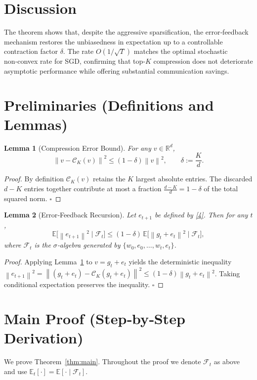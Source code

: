 \documentclass{article}
\newtheorem{lemma}{Lemma}
\newcommand{\E}{\mathbb{E}}
\newcommand{\R}{\mathbb{R}}
\newcommand{\norm}[1]{\left\lVert#1\right\rVert}
\newcommand{\topK}[1]{\mathcal{C}_K\!\left(#1\right)}
\begin{document}
\section*{Discussion}
The theorem shows that, despite the aggressive sparsification, the error‑feedback mechanism restores the unbiasedness in expectation up to a controllable contraction factor $\delta$. The rate $O(1/\sqrt{T})$ matches the optimal stochastic non‑convex rate for SGD, confirming that top‑$K$ compression does not deteriorate asymptotic performance while offering substantial communication savings.

\newpage
\section*{Preliminaries (Definitions and Lemmas)}
\begin{lemma}[Compression Error Bound]\label{lem:comp}
For any $v\in\R^d$,
\[
\norm{v-\topK{v}}^2\le(1-\delta)\norm{v}^2,\qquad \delta:=\frac{K}{d}.
\]
\end{lemma}
\begin{proof}
By definition $\topK{v}$ retains the $K$ largest absolute entries. The discarded $d-K$ entries together contribute at most a fraction $\frac{d-K}{d}=1-\delta$ of the total squared norm. \hfill $\square$
\end{proof}

\begin{lemma}[Error‑Feedback Recursion]\label{lem:error-bounded}
Let $e_{t+1}$ be defined by \eqref{4}. Then for any $t$,
\[
\E\!\big[\norm{e_{t+1}}^2\mid\mathcal{F}_t\big]
\le (1-\delta)\,\E\!\big[\norm{g_t+e_t}^2\mid\mathcal{F}_t\big],
\tag{6}
\]
where $\mathcal{F}_t$ is the $\sigma$‑algebra generated by $\{w_0,e_0,\dots,w_t,e_t\}$.
\end{lemma}
\begin{proof}
Applying Lemma~\ref{lem:comp} to $v=g_t+e_t$ yields the deterministic inequality
$\norm{e_{t+1}}^2=\norm{(g_t+e_t)-\topK{g_t+e_t}}^2\le(1-\delta)\norm{g_t+e_t}^2$.
Taking conditional expectation preserves the inequality. \hfill $\square$
\end{proof}

\section*{Main Proof (Step‑by‑Step Derivation)}
We prove Theorem~\ref{thm:main}. Throughout the proof we denote $\mathcal{F}_t$ as above and use $\E_t[\cdot]=\E[\cdot\mid\mathcal{F}_t]$.
\end{document}
